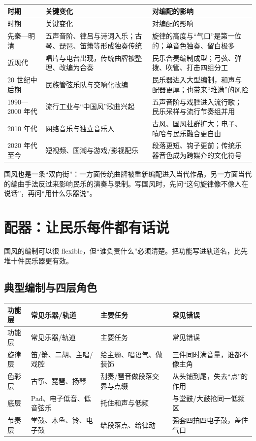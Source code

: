\begin{longtable}{p{}p{}p{}}
\toprule
时期 & 关键变化 & 对编配的影响 \\
\midrule
\endfirsthead
\toprule
时期 & 关键变化 & 对编配的影响 \\
\midrule
\endhead
先秦—明清 & 五声音阶、律吕与诗词入乐；古琴、琵琶、笛箫等形成独奏传统 & 旋律的高度与“气口”是第一位的；单音色独奏、留白极多 \\
近现代 & 唱片与电台出现，传统曲牌被整理、改编为合奏 & 民乐合奏编制成型；弓弦、弹拨、吹管、打击四组分工 \\
20 世纪中后期 & 民族管弦乐队与交响化改编 & 民乐器进入大型编制，和声与配器更厚；也带来“堆满”的风险 \\
1990—2000 年代 & 流行工业与“中国风”歌曲兴起 & 五声音阶与戏腔进入流行歌；民乐采样与流行节奏组并用 \\
2010 年代 & 网络音乐与独立音乐人 & 古风、国风社群扩大；电子、嘻哈与民乐融合更自由 \\
2020 年代至今 & 短视频、国潮与游戏/影视配乐 & 段落更短、钩子更前；传统乐器音色成为跨媒介的文化符号 \\
\bottomrule
\end{longtable}

国风也是一条“双向街”：一方面传统曲牌被重新编配进入当代作品，另一方面当代的编曲手法反过来影响民乐的演奏与录制。写国风时，先问“这句旋律像不像人在说话”，再问“用什么乐器说”。

\section{配器：让民乐每件都有话说}
\label{sec:guofeng-craft}

国风的编制可以很 flexible，但“谁负责什么”必须清楚。把功能写进轨道名，比先堆十件民乐器更有效。

\subsection{典型编制与四层角色}
\label{sec:guofeng-instrumentation}

\begin{longtable}{p{}p{}p{}p{}}
\toprule
功能层 & 常见乐器/轨道 & 主要任务 & 常见错误 \\
\midrule
\endfirsthead
\toprule
功能层 & 常见乐器/轨道 & 主要任务 & 常见错误 \\
\midrule
\endhead
旋律层 & 笛/箫、二胡、主唱/戏腔 & 给主题、唱语气、做装饰 & 三件同时满音量，谁都不像主角 \\
色彩层 & 古筝、琵琶、扬琴 & 刮奏/琶音做段落交界与点缀 & 从头铺到尾，失去“点”的作用 \\
底层 & Pad、电子低音、低音弦乐 & 托住和声与低频 & 与堂鼓/大鼓抢同一低频区 \\
节奏层 & 堂鼓、木鱼、铃、电子鼓 & 给段落点、给律动 & 强套四拍四电子鼓，盖住气口 \\
\bottomrule
\end{longtable}

